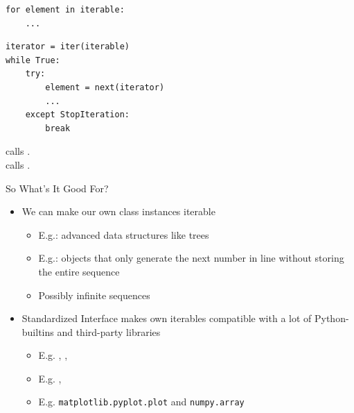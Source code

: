 
\begin{frame}[fragile]
%
\begin{codebox}
\begin{verbatim}
for element in iterable:
    ...
\end{verbatim}
\end{codebox}
%
\begin{codebox}
\begin{verbatim}
iterator = iter(iterable)
while True:
    try:
        element = next(iterator)
        ...
    except StopIteration:
        break
\end{verbatim}
\end{codebox}
%
\begin{hintbox}
\footnotesize
{} calls .\\
 calls .
\end{hintbox}
%
\end{frame}


\begin{frame}{So What's It Good For?}
%
\begin{itemize}
\item We can make our own class instances iterable
	\begin{itemize}
	\item E.\;g.: advanced data structures like trees
	\item E.\;g.: objects that only generate the next number in line without storing the entire sequence
	\item[\Thus] Possibly infinite sequences
	\end{itemize}
\item Standardized Interface makes own iterables compatible with a lot of Python-builtins and third-party libraries
	\begin{itemize}
	\item E.\;g. , , 
	\item E.\;g. , 
	\item E.\;g. \texttt{matplotlib.pyplot.plot} and \texttt{numpy.array}
	\end{itemize}
\end{itemize}
%
\end{frame}

